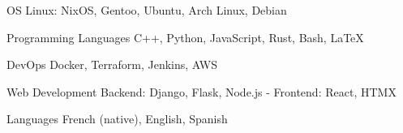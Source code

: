 

\begin{cvskills}

  \cvskill
    {OS}
    {Linux: NixOS, Gentoo, Ubuntu, Arch Linux, Debian}

  \cvskill
    {Programming Languages}
    {C++, Python, JavaScript, Rust, Bash, LaTeX}

  \cvskill
    {DevOps}
    {Docker, Terraform, Jenkins, AWS}

  \cvskill
    {Web Development}
    {Backend: Django, Flask, Node.js - Frontend: React, HTMX}

  \cvskill
    {Languages}
    {French (native), English, Spanish}

\end{cvskills}
